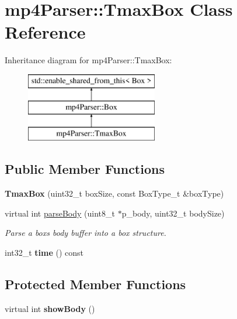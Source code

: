 \hypertarget{classmp4_parser_1_1_tmax_box}{}\section{mp4\+Parser\+::Tmax\+Box Class Reference}
\label{classmp4_parser_1_1_tmax_box}
Inheritance diagram for mp4\+Parser\+::Tmax\+Box\+:\begin{figure}[H]
\begin{center}
\leavevmode
\includegraphics[height=3.000000cm]{classmp4_parser_1_1_tmax_box}
\end{center}
\end{figure}
\subsection*{Public Member Functions}
\begin{DoxyCompactItemize}
\item 
\mbox{\label{classmp4_parser_1_1_tmax_box_a68182bae5efbc72063671911d567699a}} 
{\bfseries Tmax\+Box} (uint32\+\_\+t box\+Size, const Box\+Type\+\_\+t \&box\+Type)
\item 
virtual int \mbox{\hyperlink{classmp4_parser_1_1_tmax_box_ad9fa76bdaab68fa81892d310c8533bad}{parse\+Body}} (uint8\+\_\+t $\ast$p\+\_\+body, uint32\+\_\+t body\+Size)
\begin{DoxyCompactList}\small\item\em Parse a box\textquotesingle{}s body buffer into a box structure. \end{DoxyCompactList}\item 
\mbox{\label{classmp4_parser_1_1_tmax_box_a0be1e2cef3867f43e711c3f0e2bf7acc}} 
int32\+\_\+t {\bfseries time} () const
\end{DoxyCompactItemize}
\subsection*{Protected Member Functions}
\begin{DoxyCompactItemize}
\item 
\mbox{\label{classmp4_parser_1_1_tmax_box_abd06ad9fd40389e34052764334db63d5}} 
virtual int {\bfseries show\+Body} ()
\end{DoxyCompactItemize}
